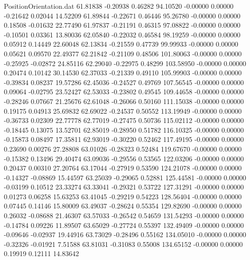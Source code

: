 \begin{filecontents}{PositionOrientation.dat}
  61.81838   -0.20938    0.46282    94.10520   -0.00000    0.00000   -0.21642    0.02044   14.52209
  61.89844   -0.22671    0.46446    95.26780   -0.00000    0.00000    0.18508   -0.01632   22.77490
  61.97837   -0.21191    0.46315    97.08822   -0.00000    0.00000   -0.10501    0.03361   13.80036
  62.05840   -0.22032    0.46584    98.19259   -0.00000    0.00000    0.05912    0.14449   22.60048
  62.13834   -0.21559    0.47739    99.99933   -0.00000    0.00000    0.05621    0.09570   22.49377
  62.21842   -0.21109    0.48506   101.80063   -0.00000    0.00000   -0.25925   -0.02872   24.85116
  62.29040   -0.22975    0.48299   103.58950   -0.00000    0.00000    0.20474    0.10142   30.14530
  62.37033   -0.21339    0.49110   105.99903   -0.00000    0.00000   -0.39834    0.08237   19.57286
  62.45036   -0.24527    0.49769   107.56545   -0.00000    0.00000    0.09064   -0.02795   23.52427
  62.53033   -0.23802    0.49545   109.44658   -0.00000    0.00000   -0.28246    0.07667   21.25676
  62.61048   -0.26066    0.50160   111.15038   -0.00000    0.00000    0.19175    0.04913   25.69832
  62.69022   -0.24537    0.50552   113.19949   -0.00000    0.00000   -0.36733    0.02309   22.77778
  62.77019   -0.27475    0.50736   115.02112   -0.00000    0.00000   -0.18445    0.13075   13.52701
  62.85019   -0.28950    0.51782   116.10325   -0.00000    0.00000   -0.15873    0.08497   17.35811
  62.93019   -0.30220    0.52462   117.49195   -0.00000    0.00000    0.23690    0.00276   27.28808
  63.01026   -0.28323    0.52484   119.67670   -0.00000    0.00000   -0.15382    0.13496   29.40474
  63.09036   -0.29556    0.53565   122.03206   -0.00000    0.00000    0.20437    0.00310   27.20764
  63.17044   -0.27919    0.53590   124.21078   -0.00000    0.00000   -0.14327   -0.08869   15.44597
  63.25039   -0.29065    0.52881   125.44581   -0.00000    0.00000   -0.03199    0.10512   23.33274
  63.33041   -0.29321    0.53722   127.31291   -0.00000    0.00000    0.01273    0.06258   15.63253
  63.41045   -0.29219    0.54223   128.56404   -0.00000    0.00000    0.07445    0.14146   15.80009
  63.49037   -0.28624    0.55354   129.82690   -0.00000    0.00000    0.26032   -0.08688   21.46307
  63.57033   -0.26542    0.54659   131.54293   -0.00000    0.00000   -0.14784    0.09226   11.89507
  63.65029   -0.27724    0.55397   132.49409   -0.00000    0.00000   -0.09646   -0.02937   19.44916
  63.73029   -0.28496    0.55162   134.05010   -0.00000    0.00000   -0.32326   -0.01921    7.51588
  63.81031   -0.31083    0.55008   134.65152   -0.00000    0.00000    0.19919    0.12111   14.83642

\end{filecontents}

